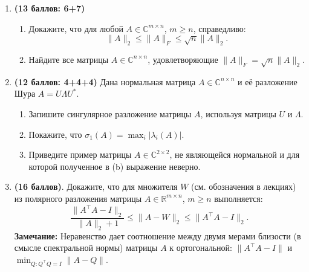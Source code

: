 \documentclass{article}
\begin{document}
\begin{enumerate}
    \item \textbf{(13 баллов: 6+7)}
    \begin{enumerate}
        \item Докажите, что для любой $A\in\mathbb{C}^{m\times n}$, $m\geq n$, справедливо:
    \[
        \|A\|_2 \leq \|A\|_F \leq \sqrt{n} \|A\|_2.
    \]
        \item Найдите все матрицы $A\in\mathbb{C}^{n\times n}$, удовлетворяющие $\|A\|_F = \sqrt{n} \|A\|_2$.
    \end{enumerate}
    \item \textbf{(12 баллов: 4+4+4)}
    Дана нормальная матрица $A\in\mathbb{C}^{n\times n}$ и её разложение Шура $A = U\Lambda U^*$.
    \begin{enumerate}
        \item Запишите сингулярное разложение матрицы $A$, используя матрицы $U$ и $\Lambda$.
        \item Покажите, что $\sigma_1(A) = \max_i |\lambda_i(A)|$.
        \item Приведите пример  матрицы $A \in \mathbb{C}^{2\times 2}$, не являющейся нормальной и для которой полученное в (b) выражение неверно. 
    \end{enumerate}
    \item \textbf{(16  баллов)}.
    Докажите, что для множителя $W$ (см. обозначения в лекциях) из полярного разложения матрицы $A\in\mathbb{R}^{m\times n}$, $m\geq n$ выполняется:
    \[  
        \frac{\|A^\top A - I\|_2}{\|A\|_2 + 1} \leq \|A - W \|_2 \leq \|A^\top  A - I\|_2.
    \]
    \textbf{Замечание:} Неравенство дает соотношение между двумя мерами близости (в смысле спектральной нормы) матрицы $A$ к ортогональной: $\|A^\top A - I\|$ и $\min_{Q: Q^\top Q=I} \|A - Q\|$.
\end{enumerate}
\end{document}
